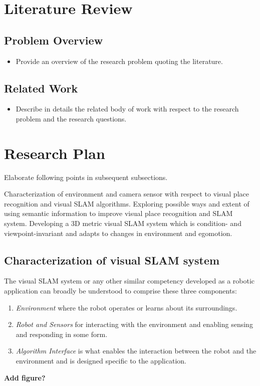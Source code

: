 \documentclass{article}
\begin{document}
\section{Literature Review}

\subsection{Problem Overview}
\begin{itemize}
 \item Provide an overview of the research problem quoting the literature.
\end{itemize}

\subsection{Related Work}
\begin{itemize}
 \item Describe in details the related body of work with respect to the research problem and the research questions.
\end{itemize}


\section{Research Plan}

Elaborate following points in subsequent subsections.
\begin{outline}
 \1 Characterization of environment and camera sensor with respect to visual place recognition and visual SLAM algorithms.
 \1 Exploring possible ways and extent of using semantic information to improve visual place recognition and SLAM system.
 \1 Developing a 3D metric visual SLAM system which is condition- and viewpoint-invariant and adapts to changes in environment and egomotion.
\end{outline}

\subsection{Characterization of visual SLAM system}
The visual SLAM system or any other similar competency developed as a robotic application can broadly be understood to comprise these three components:
\begin{enumerate}
 \item \emph{Environment} where the robot operates or learns about its surroundings.
 \item \emph{Robot and Sensors} for interacting with the environment and enabling sensing and responding in some form.
 \item \emph{Algorithm Interface} is what enables the interaction between the robot and the environment and is designed specific to the application.
\end{enumerate}
\textbf{Add figure?}
\end{document}
